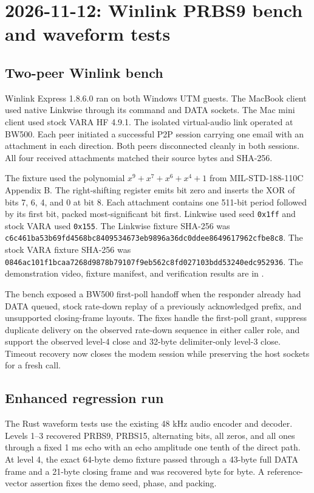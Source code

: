 \documentclass[11pt,a4paper]{article}
\newcommand{\pathtext}[1]{\path{#1}}
\newcommand{\hashtext}[4]{\texttt{\small #1\allowbreak{}#2\allowbreak{}#3\allowbreak{}#4}}
\begin{document}
\section{2026-11-12: Winlink PRBS9 bench and waveform tests}
\label{sec:prbs9-bench}

\subsection{Two-peer Winlink bench}

Winlink Express 1.8.6.0 ran on both Windows UTM guests. The MacBook
client used native Linkwise through its command and DATA sockets. The
Mac mini client used stock VARA HF 4.9.1. The isolated virtual-audio
link operated at BW500. Each peer initiated a successful P2P session
carrying one email with an attachment in each direction. Both peers
disconnected cleanly in both sessions. All four received attachments
matched their source bytes and SHA-256.

The fixture used the polynomial $x^9+x^7+x^6+x^4+1$ from MIL-STD-188-110C
Appendix B. The right-shifting register emits bit zero and inserts the XOR
of bits 7, 6, 4, and 0 at bit 8. Each attachment contains one 511-bit
period followed by its first bit, packed most-significant bit first.
Linkwise used seed \texttt{0x1ff} and stock VARA used \texttt{0x155}.
The Linkwise fixture SHA-256 was
\hashtext{c6c461ba53b69fd4}{568bc8409534673e}{b9896a36dc0ddee8}{649617962cfbe8c8}.
The stock VARA fixture SHA-256 was
\hashtext{0846ac101f1bcaa7}{268d9878b79107f9}{eb562c8fd027103b}{dd53240edc952936}.
The demonstration video, fixture manifest, and verification results are
in \pathtext{docs/media/modem/winlink-prbs9/}.

The bench exposed a BW500 first-poll handoff when the responder already
had DATA queued, stock rate-down replay of a previously acknowledged
prefix, and unsupported closing-frame layouts. The fixes handle the
first-poll grant, suppress duplicate delivery on the observed rate-down
sequence in either caller role, and support the observed level-4 close
and 32-byte delimiter-only level-3 close. Timeout recovery now closes
the modem session while preserving the host sockets for a fresh call.

\subsection{Enhanced regression run}

The Rust waveform tests use the existing 48 kHz audio encoder and decoder.
Levels 1--3 recovered PRBS9, PRBS15, alternating bits, all zeros, and all
ones through a fixed 1 ms echo with an echo amplitude one tenth of the
direct path. At level 4, the exact 64-byte demo fixture passed through a
43-byte full DATA frame and a 21-byte closing frame and was recovered
byte for byte. A reference-vector assertion fixes the demo seed, phase,
and packing.
\end{document}
